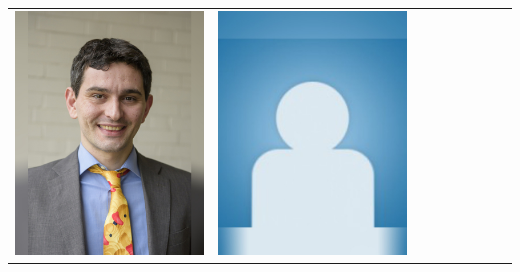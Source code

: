 \documentclass[landscape,a0paper,fontscale=0.292]{baposter}
\begin{document}
\begin{poster}
{\begin{center}
\begin{tabularx}{\linewidth}{X X X X X X X X X}
{\centering \includegraphics[width=0.65\linewidth]{tani.jpg}}&
{\centering \includegraphics[width=0.65\linewidth]{MISSING.jpg}}&

\end{tabularx}
\end{center}}
\end{poster}
\end{document}
